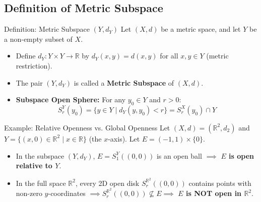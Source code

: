 \documentclass[11pt,a4paper]{article}
\begin{document}
\subsection{Definition of Metric Subspace}

\begin{defbox}{Definition: Metric Subspace $(Y, d_Y)$}
Let $(X, d)$ be a metric space, and let $Y$ be a non-empty subset of $X$.
\begin{itemize}
    \item Define $d_Y: Y \times Y \to \mathbb{R}$ by $d_Y(x, y) = d(x, y)$ for all $x, y \in Y$ (metric restriction).
    \item The pair $(Y, d_Y)$ is called a \textbf{Metric Subspace} of $(X, d)$.
    \item \textbf{Subspace Open Sphere:} For any $y_0 \in Y$ and $r > 0$:
    \begin{equation}
        S_r^Y(y_0) = \{ y \in Y \mid d_Y(y, y_0) < r \} = S_r^X(y_0) \cap Y
    \end{equation}
\end{itemize}
\end{defbox}

\begin{exbox}{Example: Relative Openness vs. Global Openness}
Let $(X, d) = (\mathbb{R}^2, d_2)$ and $Y = \{ (x, 0) \in \mathbb{R}^2 \mid x \in \mathbb{R} \}$ (the $x$-axis).
Let $E = (-1, 1) \times \{0\}$.
\begin{itemize}
    \item In the subspace $(Y, d_Y)$, $E = S_1^Y((0,0))$ is an open ball $\implies$ \textbf{$E$ is open relative to $Y$}.
    \item In the full space $\mathbb{R}^2$, every 2D open disk $S_r^{\mathbb{R}^2}((0,0))$ contains points with non-zero $y$-coordinates $\implies S_r^{\mathbb{R}^2}((0,0)) \not\subseteq E \implies$ \textbf{$E$ is NOT open in $\mathbb{R}^2$}.
\end{itemize}
\end{exbox}
\end{document}
